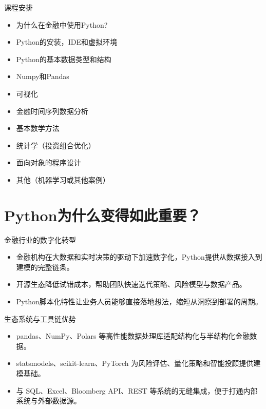 \documentclass[9pt]{ctexbeamer}
\begin{document}
\begin{frame}{课程安排}

	\begin{itemize}
		\item 为什么在金融中使用Python?
		\item Python的安装，IDE和虚拟环境
		\item Python的基本数据类型和结构
		\item Numpy和Pandas
		\item 可视化
		\item 金融时间序列数据分析
		\item 基本数学方法
		\item 统计学（投资组合优化）
		\item 面向对象的程序设计
		\item 其他（机器学习或其他案例）
	\end{itemize}
\end{frame}


\section{Python为什么变得如此重要？}

\begin{frame}{金融行业的数字化转型}
    \begin{itemize}
        \item 金融机构在大数据和实时决策的驱动下加速数字化，Python提供从数据接入到建模的完整链条。
        \item 开源生态降低试错成本，帮助团队快速迭代策略、风险模型与数据产品。
        \item Python脚本化特性让业务人员能够直接落地想法，缩短从洞察到部署的周期。
    \end{itemize}
\end{frame}

\begin{frame}{生态系统与工具链优势}
    \begin{itemize}
        \item pandas、NumPy、Polars 等高性能数据处理库适配结构化与半结构化金融数据。
        \item statsmodels、scikit-learn、PyTorch 为风险评估、量化策略和智能投顾提供建模基础。
        \item 与 SQL、Excel、Bloomberg API、REST 等系统的无缝集成，便于打通内部系统与外部数据源。
    \end{itemize}
\end{frame}
\end{document}
